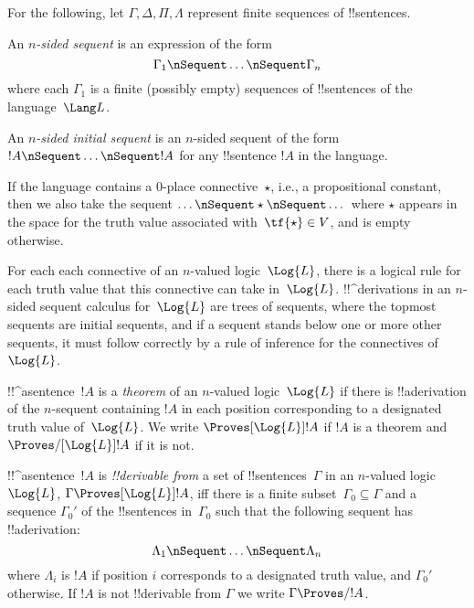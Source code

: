 \documentclass[../../../include/open-logic-section]{subfiles}
\begin{document}


For the following, let $\Gamma, \Delta, \Pi, \Lambda$ represent finite
sequences of !!{sentence}s.

\begin{defn}[Sequent]
An \emph{$n$-sided sequent} is an expression of the form
\[
\Gamma_1 \nSequent \dots \nSequent \Gamma_n
\]
where each $\Gamma_1$ is a finite (possibly empty) sequences of
!!{sentence}s of the language~$\Lang L$.
\end{defn}

\begin{defn}
An \emph{$n$-sided initial sequent} is an $n$-sided sequent of the
form $!A \nSequent \dots \nSequent !A$ for any !!{sentence} $!A$ in
the language.

If the language contains a $0$-place connective~$\star$, i.e., a
propositional constant, then we also take the sequent $\dots \nSequent
\star \nSequent \dots$ where $\star$ appears in the space for the truth
value associated with~$\tf{\star} \in V$, and is empty otherwise. 
\end{defn}

For each each connective of an $n$-valued logic~$\Log{L}$, there is a
logical rule for each truth value that this connective can take
in~$\Log{L}$. !!^{derivation}s in an $n$-sided sequent calculus
for~$\Log{L}$ are trees of sequents, where the topmost sequents are
initial sequents, and if a sequent stands below one or more other
sequents, it must follow correctly by a rule of inference for the
connectives of~$\Log{L}$.

\begin{defn}[Theorems]
!!^a{sentence}~$!A$ is a \emph{theorem} of an $n$-valued
logic~$\Log{L}$ if there is !!a{derivation}
of the $n$-sequent containing $!A$ in each position corresponding to a
designated truth value of~$\Log{L}$.  We write $\Proves[\Log{L}]
!A$ if $!A$ is a theorem and $\Proves/[\Log{L}] !A$ if it is not.
\end{defn}

\begin{defn}[!!^{derivability}]
!!^a{sentence}~$!A$ is \emph{!!{derivable} from} a set of
!!{sentence}s~$\Gamma$ in an $n$-valued logic~$\Log{L}$, $\Gamma
\Proves[\Log{L}] !A$, iff there is a finite subset~$\Gamma_0 \subseteq
\Gamma$ and a sequence $\Gamma_0'$ of the !!{sentence}s in~$\Gamma_0$
such that the following sequent has  !!a{derivation}:
\[ \Lambda_1 \nSequent \dots \nSequent \Lambda_n \] where $\Lambda_i$
is $!A$ if position $i$ corresponds to a designated truth value, and
$\Gamma_0'$otherwise. If $!A$ is not !!{derivable} from $\Gamma$ we
write $\Gamma \Proves/ !A$.
\end{defn}
\end{document}
